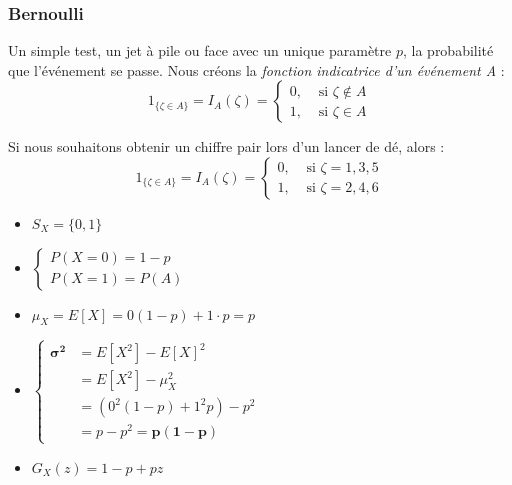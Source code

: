 \documentclass[11pt,a4paper]{article}
\numberwithin{equation}{section}
\begin{document}
\subsubsection{Bernoulli}
Un simple test, un jet à pile ou face avec un unique paramètre $p$, la probabilité que l'événement se passe. Nous créons la \textit{fonction indicatrice d'un événement A} :
\begin{equation}
	1_{\{\zeta \in A\}} = I_A(\zeta) = \left\{ \begin{array}{lr}
	0, &  \text{ si } \zeta \notin A\\
	1, &  \text{ si } \zeta \in A
	\end{array}\right.
\end{equation}
\begin{exemple}
    Si nous souhaitons obtenir un chiffre pair lors d'un lancer de dé, alors :
    \[	1_{\{\zeta \in A\}} = I_A(\zeta) = \left\{ \begin{array}{lr}
	0, &  \text{ si } \zeta = 1,3,5\\
	1, &  \text{ si } \zeta = 2,4,6
	\end{array}\right.\]
\end{exemple}
\begin{multicols}{2}
    \begin{itemize}
        \item $S_X = \{0,1\}$
        \item $\left\{\begin{array}{l}P(X=0) = 1-p\\ P(X=1) = P(A)\end{array}\right.$
        \item $\mu_X = E[X] = 0(1-p) + 1\cdot p = p$
        \item $\left\{\begin{array}{ll}\mathbf{\sigma^2} &= E[X^2] - E[X]^2\\& = E[X^2] - \mu_X^2 \\&= (0^2(1-p) +1^2 p) - p^2 \\&= p-p^2 = \mathbf{p(1-p)}\end{array}\right.$
        \item $G_X(z) = 1-p+pz$
\end{itemize}
\end{multicols}
\end{document}
